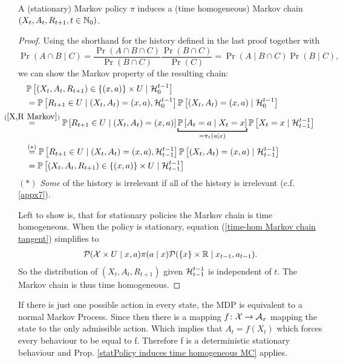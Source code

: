 \begin{prop}\label{statPolicy induces time homogeneous MC}
	A (stationary) Markov  policy \(\pi\) induces a (time homogeneous) Markov chain \((X_t,A_t,R_{t+1},t\in\mathbb{N}_0)\).
\end{prop}
\begin{proof} 

	Using the shorthand for the history defined in the last proof together with 
	\[
		\Pr(A\cap B \mid C)
		=\frac{\Pr(A\cap B\cap C)}{\Pr(B\cap C)}\frac{\Pr(B\cap C)}{\Pr(C)} 
		= \Pr(A\mid B\cap C)\Pr(B\mid C),
	\]
	we can show the Markov property of the resulting chain:
	\begin{align}
		&\Pr\left[(X_t,A_t,R_{t+1})\in\{(x,a)\}\times U \mid \cH_0^{t-1} \right] \nonumber \\
		&=\Pr\left[R_{t+1}\in U \mid (X_t, A_t)=(x,a), \cH_0^{t-1}\right]
		\Pr\left[(X_t, A_t)=(x,a)\mid\cH_0^{t-1}\right]
		\nonumber\\
		&\lxeq{(\ref{X,R Markov})}\Pr\left[R_{t+1}\in U \mid (X_t, A_t)=(x,a)\right]
		\underbracket[1pt]{\Pr\left[A_t=a \mid X_t=x\right]}_{=\pi_t(a\mid x)}
		\Pr\left[X_t=x\mid \cH_{t-1}^{t-1}\right]
		\label{time-hom Markov chain tangent}\\
		&\lxeq{(*)}\Pr\left[R_{t+1}\in U \mid (X_t, A_t)=(x,a), \cH_{t-1}^{t-1}\right]
		\Pr\left[(X_t, A_t)=(x,a)\mid\cH_{t-1}^{t-1}\right]
		\nonumber\\
		&=\Pr\left[(X_t,A_t,R_{t+1})\in\{(x,a)\}\times U \mid \cH_{t-1}^{t-1} \right]
		\nonumber
	\end{align}
	\((*)\) \emph{Some} of the history is irrelevant if all of the history is irrelevant (c.f. \ref{appx7}).
	
	Left to show is, that for stationary policies the Markov chain is time homogeneous. When the policy is stationary, equation (\ref{time-hom Markov chain tangent}) simplifies to
	\begin{align*}
		\mathcal{P}(\mathcal{X}\times U \mid x,a)\pi(a\mid x)
		\mathcal{P}(\{x\}\times \mathbb{R} \mid x_{t-1}, a_{t-1}).
	\end{align*}
	So the distribution of \((X_{t},A_{t},R_{t+1})\) given \(\mathcal{H}^{t-1}_{t-1}\) is independent of \(t\). The Markov chain is thus time homogeneous.
\end{proof} 
\begin{remark} 
If there is just one possible action in every state, the MDP is equivalent to a normal Markov Process. 
Since then there is a mapping \(f\colon\mathcal{X}\to\mathcal{A}_x\) mapping the state to  the only admissible action. Which implies that \(A_t=f(X_t)\) which forces every behaviour to be equal to f. Therefore f is a deterministic stationary behaviour and Prop. \ref{statPolicy induces time homogeneous MC} applies.  
\end{remark}

